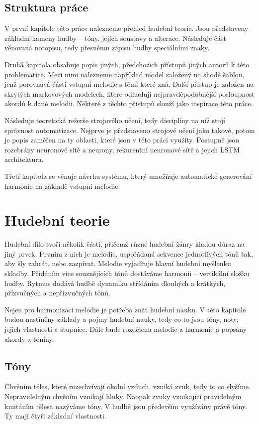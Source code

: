 \section{Struktura práce}
V první kapitole této práce nalezneme přehled hudební teorie.
Jsou představeny základní kameny hudby -- tóny, jejich soustavy a alterace.
Následuje část věnovaná notopisu,
tedy přesnému zápisu hudby speciálními znaky.
\par
Druhá kapitola obsahuje popis jiných, předchozích přístupů jiných autorů k této problematice.
Mezi nimi nalezneme například model založený na shodě šablon, 
jenž porovnává části vstupní melodie s těmi které zná.
Další přístup je založen na skrytých markovových modelech, 
které odhadují nejpravděpodobnější posloupnost akordů k dané melodii.
Některé z těchto přístupů slouží jako inspirace této práce.
\par
Následuje teoretická rešerše strojového učení,
tedy disciplíny na níž stojí správnost automatizace.
Nejprve je představeno strojové učení jako takové,
potom je popis zaměřen na ty oblasti, 
které jsou v této práci využity.
Postupně jsou rozebrány neuronové sítě a neurony,
rekurentní neuronové sítě a jejich LSTM architektura.
\par
Třetí kapitola se věnuje návrhu systému,
který umožňuje automatické generování harmonie na základě vstupní melodie.

\chapter{Hudební teorie}
Hudební dílo tvoří několik částí, 
přičemž různé hudební žánry kladou důraz na jiný prvek.
Prvním z nich je melodie, uspořádaná sekvence jednotlivých tónů tak,
aby šly zahrát, nebo zazpívat. 
Melodie vyjadřuje hlavní hudební myšlenku skladby. 
Přidáním více souznějících tónů dostáváme harmonii -- vertikální složku hudby.
Rytmus dodává hudbě dynamiku střídáním dlouhých a krátkých,
přízvučných a nepřízvučných tónů.
\par

Nejen pro harmonizaci melodie je potřeba znát hudební nauku. 
V této kapitole budou nastíněny základy a pojmy hudební nauky, 
tedy co to jsou tóny, noty, jejich vlastnosti a stupnice. 
Dále bude rozdělena melodie a harmonie a popsány akordy a tóniny. \par 

\section{Tóny}
Chvěním těles, které rozechvívají okolní vzduch, vzniká zvuk, 
tedy to co slyšíme. 
Nepravidelným chvěním vznikají hluky. 
Naopak zvuky vznikající pravidelným kmitáním tělesa nazýváme tóny. 
V hudbě jsou především využívány právě tóny. 
Ty mají čtyři základní vlastnosti. \par

